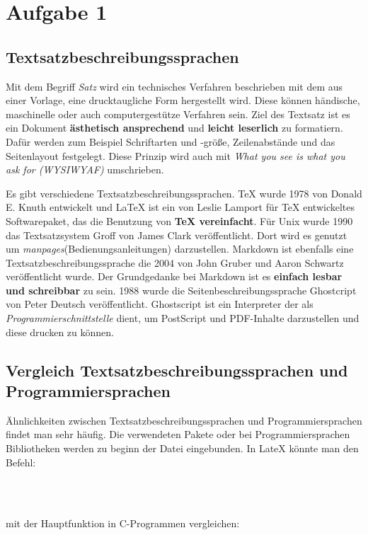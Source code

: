 \chapter{Aufgabe 1}
\section{Textsatzbeschreibungssprachen}
Mit dem Begriff \textit{Satz} wird ein technisches Verfahren beschrieben mit dem aus einer Vorlage, eine drucktaugliche Form hergestellt wird.
Diese können händische, maschinelle oder auch computergestütze Verfahren sein.
Ziel des Textsatz ist es ein Dokument \textbf{ästhetisch ansprechend} und \textbf{leicht leserlich} zu formatiern.
Dafür werden zum Beispiel Schriftarten und -größe, Zeilenabstände und das Seitenlayout festgelegt.
Diese Prinzip wird auch mit \textit{What you see is what you ask for (WYSIWYAF)} umschrieben.\par
Es gibt verschiedene Textsatzbeschreibungssprachen.
TeX wurde 1978 von Donald E. Knuth entwickelt und LaTeX ist ein von Leslie Lamport für TeX entwickeltes Softwarepaket, das die Benutzung von \textbf{TeX vereinfacht}.
Für Unix wurde 1990 das Textsatzsystem Groff von James Clark veröffentlicht.
Dort wird es genutzt um \textit{manpages}(Bedienungsanleitungen) darzustellen.
Markdown ist ebenfalls eine Textsatzbeschreibungssprache die 2004 von John Gruber und Aaron Schwartz veröffentlicht wurde.
Der Grundgedanke bei Markdown ist es \textbf{einfach lesbar und schreibbar} zu sein.
1988 wurde die Seitenbeschreibungssprache Ghostcript von Peter Deutsch veröffentlicht.
Ghostscript ist ein Interpreter der als \textit{Programmierschnittstelle} dient, um PostScript und PDF-Inhalte darzustellen und diese drucken zu können. 

\section{Vergleich Textsatzbeschreibungssprachen und Programmiersprachen}
Ähnlichkeiten zwischen Textsatzbeschreibungssprachen und Programmiersprachen findet man sehr häufig. 
Die verwendeten Pakete oder bei Programmiersprachen Bibliotheken werden zu beginn der Datei eingebunden.
In LateX könnte man den Befehl:
\begin{lstlisting}
 


\end{lstlisting}

mit der Hauptfunktion in C-Programmen vergleichen:

